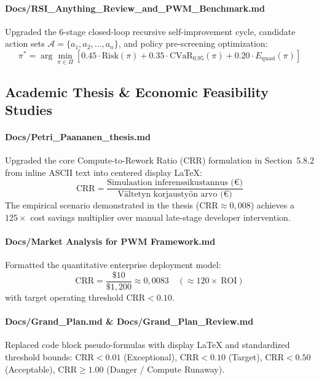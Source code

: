 \documentclass[11pt,a4paper]{article}
\begin{document}
\paragraph{Docs/RSI\_Anything\_Review\_and\_PWM\_Benchmark.md}
Upgraded the 6-stage closed-loop recursive self-improvement cycle, candidate action sets $\mathcal{A} = \{a_1, a_2, \dots, a_n\}$, and policy pre-screening optimization:
\begin{equation}
\pi^* = \arg\min_{\pi \in \Pi} \left[0.45 \cdot \text{Risk}(\pi) + 0.35 \cdot \text{CVaR}_{0.95}(\pi) + 0.20 \cdot E_{\text{quasi}}(\pi)\right]
\end{equation}

\subsection{Academic Thesis \& Economic Feasibility Studies}

\paragraph{Docs/Petri\_Paananen\_thesis.md}
Upgraded the core Compute-to-Rework Ratio (CRR) formulation in Section~5.8.2 from inline ASCII text into centered display \LaTeX{}:
\begin{equation}
\text{CRR} = \frac{\text{Simulaation inferenssikustannus (€)}}{\text{Vältetyn korjaustyön arvo (€)}}
\end{equation}
The empirical scenario demonstrated in the thesis ($\text{CRR} \approx 0{,}008$) achieves a $125\times$ cost savings multiplier over manual late-stage developer intervention.

\paragraph{Docs/Market Analysis for PWM Framework.md}
Formatted the quantitative enterprise deployment model:
\begin{equation}
\text{CRR} = \frac{\$10}{\$1{,}200} \approx 0{,}0083 \quad (\approx 120\times\ \text{ROI})
\end{equation}
with target operating threshold $\text{CRR} < 0.10$.

\paragraph{Docs/Grand\_Plan.md \& Docs/Grand\_Plan\_Review.md}
Replaced code block pseudo-formulas with display \LaTeX{} and standardized threshold bounds: $\text{CRR} < 0.01$ (Exceptional), $\text{CRR} < 0.10$ (Target), $\text{CRR} < 0.50$ (Acceptable), $\text{CRR} \ge 1.00$ (Danger / Compute Runaway).
\end{document}

